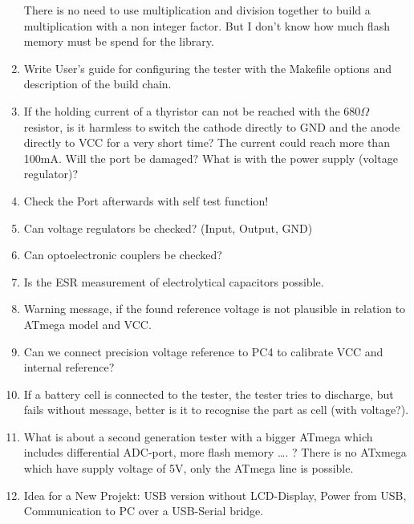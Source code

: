\begin{enumerate}
There is no need to use multiplication and division together to build a multiplication with a non integer factor.
But I don't know how much flash memory must be spend for the library.
\item Write User's guide for configuring the tester with the Makefile options and description of the build chain.
\item If the holding current of a thyristor can not be reached with the \(680\Omega\) resistor, is it harmless to switch the cathode directly to GND
and the anode directly to VCC for a very short time?
The current could reach more than 100mA. Will the port be damaged? What is with the power supply (voltage regulator)?
\item Check the Port afterwards with self test function!
\item Can voltage regulators be checked? (Input, Output, GND)
\item Can optoelectronic couplers be checked?  
\item Is the ESR measurement of electrolytical capacitors  possible.
\item Warning message, if the found reference voltage is not plausible in relation to ATmega model and VCC.
\item Can we connect precision voltage reference to PC4 to calibrate VCC and internal reference?
\item If a battery cell is connected to the tester, the tester tries to discharge,
but fails without message, better is it to recognise the part as cell (with voltage?).
\item What is about a second generation tester with a bigger ATmega which includes differential ADC-port, more flash memory …. ?
There is no ATxmega which have supply voltage of 5V, only the ATmega line  is possible. 
\item Idea for a New Projekt: USB  version without LCD-Display, Power from USB, Communication to PC over a USB-Serial bridge.
\end{enumerate}

